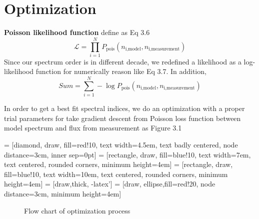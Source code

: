 \section{Optimization}

\par \textbf{Poisson likelihood function} define as Eq 3.6
\begin{equation}
    \mathcal{L} = \prod_{i=1}^{N} P_{\text{pois}}(n_{\text{i,model}}, n_{\text{i,measurement}})
\end{equation}
Since our spectrum order is in different decade, we redefined a likelihood as a log-likelihood function for numerically reason like Eq 3.7. In addition, 
\begin{equation}
    Sum = \sum_{i=1}^{N} -\log P_{\text{pois}}(n_{\text{i,model}}, n_{\text{i,measurement}})
\end{equation}


\par In order to get a best fit spectral indices, we do an optimization with a proper trial parameters for take gradient descent from Poisson loss function between model spectrum and flux from measurement as Figure 3.1


 = [diamond, draw, fill=red!10, 
    text width=4.5em, text badly centered, node distance=3cm, inner sep=0pt]
 = [rectangle, draw, fill=blue!10, 
    text width=7em, text centered, rounded corners, minimum height=4em]
 = [rectangle, draw, fill=blue!10, 
    text width=10em, text centered, rounded corners, minimum height=4em]
 = [draw,thick, -latex']
 = [draw, ellipse,fill=red!20, node distance=3cm,
    minimum height=4em]

\begin{figure}[!h]
    \centering
    \caption{Flow chart of optimization process}
\end{figure}




